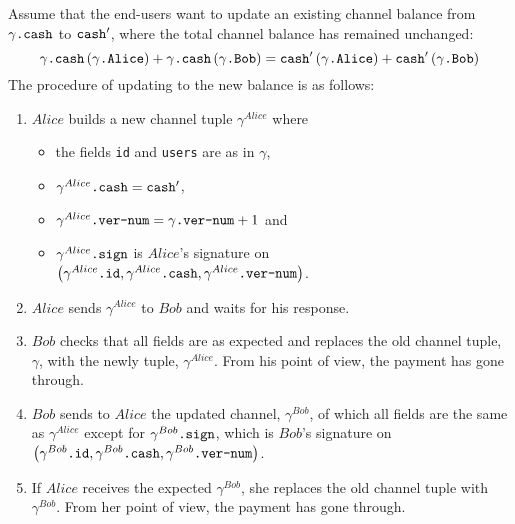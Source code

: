     Assume that the end-users want to update an existing channel balance from
    $\gamma\mbox{\texttt{.cash}}$ to $\mbox{\texttt{cash}}'$, where the total
    channel balance has remained unchanged:
    \begin{equation*}
      \gamma\mbox{\texttt{.cash}}\left(\gamma\mbox{\texttt{.Alice}}\right) +
      \gamma\mbox{\texttt{.cash}}\left(\gamma\mbox{\texttt{.Bob}}\right) =
      \mbox{\texttt{cash}}'\left(\gamma\mbox{\texttt{.Alice}}\right) +
      \mbox{\texttt{cash}}'\left(\gamma\mbox{\texttt{.Bob}}\right)
    \end{equation*}
    The procedure of updating to the new balance is as follows:
    \begin{enumerate}
      \item $Alice$ builds a new channel tuple $\gamma^{Alice}$ where
      \begin{itemize}
        \item the fields \texttt{id} and \texttt{users} are as in $\gamma$,
        \item $\gamma^{Alice}\mbox{\texttt{.cash}} = \mbox{\texttt{cash}}'$,
        \item $\gamma^{Alice}\mbox{\texttt{.ver-num}} = \gamma\mbox{\texttt{.ver-num}} +
        1$ and
        \item $\gamma^{Alice}\mbox{\texttt{.sign}}$ is $Alice$'s signature on \newline
        $\left(\gamma^{Alice}\mbox{\texttt{.id}}, \gamma^{Alice}\mbox{\texttt{.cash}},
        \gamma^{Alice}\mbox{\texttt{.ver-num}}\right)$.
      \end{itemize}
      \item $Alice$ sends $\gamma^{Alice}$ to $Bob$ and waits for his response.
      \item $Bob$ checks that all fields are as expected and replaces the old channel
      tuple, $\gamma$, with the newly tuple, $\gamma^{Alice}$. From his point of view, the
      payment has gone through.
      \item $Bob$ sends to $Alice$ the updated channel, $\gamma^{Bob}$, of which all
      fields are the same as $\gamma^{Alice}$ except for
      $\gamma^{Bob}\mbox{\texttt{.sign}}$, which is $Bob$'s signature on
      $\left(\gamma^{Bob}\mbox{\texttt{.id}}, \gamma^{Bob}\mbox{\texttt{.cash}},
      \gamma^{Bob}\mbox{\texttt{.ver-num}}\right)$.
      \item If $Alice$ receives the expected $\gamma^{Bob}$, she replaces the old channel
      tuple with $\gamma^{Bob}$. From her point of view, the payment has gone through.
    \end{enumerate}

